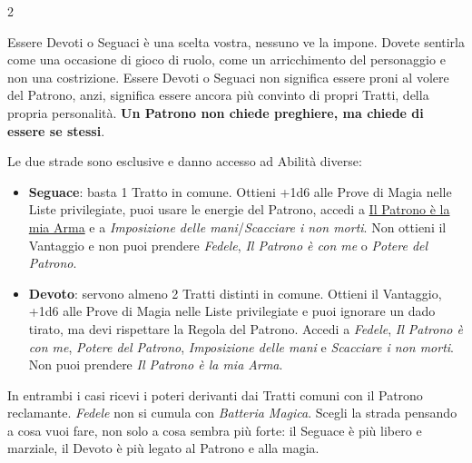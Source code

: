 \begin{multicols}{2}
\begin{giocatore}
Essere Devoti o Seguaci è una scelta vostra, nessuno ve la impone. Dovete sentirla come una occasione di gioco di ruolo, come un arricchimento del personaggio e non una costrizione. Essere Devoti o Seguaci non significa essere proni al volere del Patrono, anzi, significa essere ancora più convinto di propri Tratti, della propria personalità. \textbf{Un Patrono non chiede preghiere, ma chiede di essere se stessi}.
\end{giocatore}

\begin{giocatore}
Le due strade sono esclusive e danno accesso ad Abilità diverse:
\begin{itemize}[leftmargin=*] \setlength{\itemsep}{0pt}
\item \textbf{Seguace}: basta 1 Tratto in comune. Ottieni +1d6 alle Prove di Magia nelle Liste privilegiate, puoi usare le energie del Patrono, accedi a \hyperlink{Il Patrono è la mia Arma}{Il Patrono è la mia Arma} e a \textit{Imposizione delle mani}/\textit{Scacciare i non morti}. Non ottieni il Vantaggio e non puoi prendere \textit{Fedele}, \textit{Il Patrono è con me} o \textit{Potere del Patrono}.
\item \textbf{Devoto}: servono almeno 2 Tratti distinti in comune. Ottieni il Vantaggio, +1d6 alle Prove di Magia nelle Liste privilegiate e puoi ignorare un dado tirato, ma devi rispettare la Regola del Patrono. Accedi a \textit{Fedele}, \textit{Il Patrono è con me}, \textit{Potere del Patrono}, \textit{Imposizione delle mani} e \textit{Scacciare i non morti}. Non puoi prendere \textit{Il Patrono è la mia Arma}.
\end{itemize}
In entrambi i casi ricevi i poteri derivanti dai Tratti comuni con il Patrono reclamante. \textit{Fedele} non si cumula con \textit{Batteria Magica}. Scegli la strada pensando a cosa vuoi fare, non solo a cosa sembra più forte: il Seguace è più libero e marziale, il Devoto è più legato al Patrono e alla magia.
\end{giocatore}


\end{multicols}
